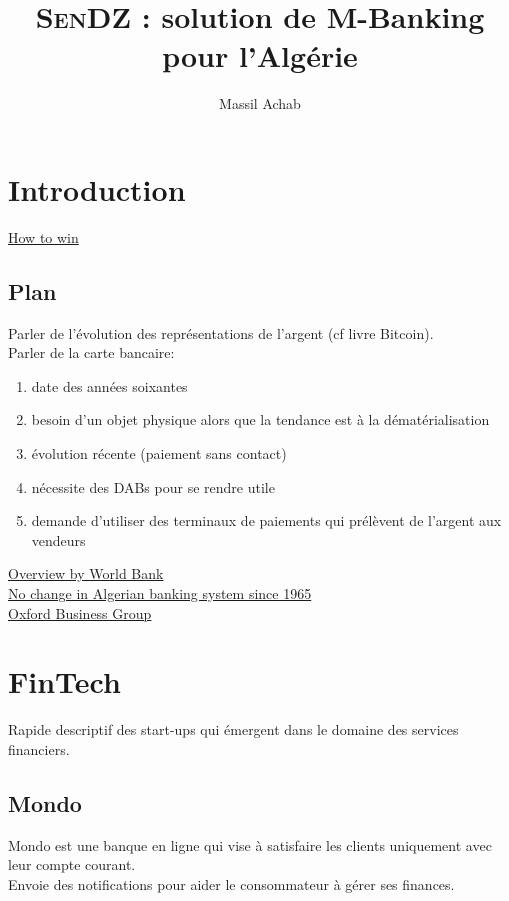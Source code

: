 \documentclass{report}
\author{Massil Achab}
\title{\textsc{SenDZ} : solution de M-Banking pour l'Alg\'erie}
\begin{document}
\maketitle
\tableofcontents

\chapter{Introduction}
\href{https://www.bcgperspectives.com/content/articles/financial_institutions_telecommunications_africa_blazes_trail_mobile_money/?chapter=3#chapter3}{How to win}
\section{Plan}
Parler de l'\'evolution des repr\'esentations de l'argent (cf livre Bitcoin). \\
Parler de la carte bancaire:
\begin{enumerate}
  \item date des ann\'ees soixantes
  \item besoin d'un objet physique alors que la tendance est à la d\'emat\'erialisation
  \item \'evolution r\'ecente (paiement sans contact)
  \item n\'ecessite des DABs pour se rendre utile
  \item demande d'utiliser des terminaux de paiements qui prélèvent de l'argent aux vendeurs
\end{enumerate}
\href{http://www.worldbank.org/en/country/algeria/overview}{Overview by World Bank} \\
\href{https://www.linkedin.com/pulse/why-change-algerian-banking-system-since-1965-zahir-serrai}{No change in Algerian banking system since 1965} \\
\href{https://www.oxfordbusinessgroup.com/country/algeria}{Oxford Business Group}

\chapter{FinTech}
Rapide descriptif des start-ups qui émergent dans le domaine des services financiers.
\section{Mondo}
Mondo est une banque en ligne qui vise à satisfaire les clients uniquement avec leur compte courant. \\
Envoie des notifications pour aider le consommateur à gérer ses finances.
\end{document}

